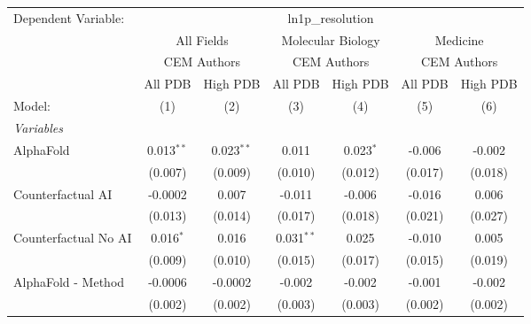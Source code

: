 \begingroup
\centering
\begin{tabular}{lcccccc}
   \tabularnewline \midrule \midrule
   Dependent Variable: & \multicolumn{6}{c}{ln1p\_resolution}\\
 & \multicolumn{2}{c}{All Fields} & \multicolumn{2}{c}{Molecular Biology} & \multicolumn{2}{c}{Medicine} \\
\cmidrule(lr){2-3} \cmidrule(lr){4-5} \cmidrule(lr){6-7}
 & \multicolumn{2}{c}{CEM Authors} & \multicolumn{2}{c}{CEM Authors} & \multicolumn{2}{c}{CEM Authors} \\
\cmidrule(lr){2-3} \cmidrule(lr){4-5} \cmidrule(lr){6-7}
 & \multicolumn{1}{c}{All PDB} & \multicolumn{1}{c}{High PDB} & \multicolumn{1}{c}{All PDB} & \multicolumn{1}{c}{High PDB} & \multicolumn{1}{c}{All PDB} & \multicolumn{1}{c}{High PDB} \\
\cmidrule(lr){2-2} \cmidrule(lr){3-3} \cmidrule(lr){4-4} \cmidrule(lr){5-5} \cmidrule(lr){6-6} \cmidrule(lr){7-7}
   Model:                                                     & (1)           & (2)           & (3)          & (4)         & (5)         & (6)\\  
   \midrule
   \emph{Variables}\\
   AlphaFold                                                  & 0.013$^{**}$  & 0.023$^{**}$  & 0.011        & 0.023$^{*}$ & -0.006      & -0.002\\   
                                                              & (0.007)       & (0.009)       & (0.010)      & (0.012)     & (0.017)     & (0.018)\\   
   Counterfactual AI                                          & -0.0002       & 0.007         & -0.011       & -0.006      & -0.016      & 0.006\\   
                                                              & (0.013)       & (0.014)       & (0.017)      & (0.018)     & (0.021)     & (0.027)\\   
   Counterfactual No AI                                       & 0.016$^{*}$   & 0.016         & 0.031$^{**}$ & 0.025       & -0.010      & 0.005\\   
                                                              & (0.009)       & (0.010)       & (0.015)      & (0.017)     & (0.015)     & (0.019)\\   
   AlphaFold - Method                                         & -0.0006       & -0.0002       & -0.002       & -0.002      & -0.001      & -0.002\\   
                                                              & (0.002)       & (0.002)       & (0.003)      & (0.003)     & (0.002)     & (0.002)\\   

\end{tabular}
